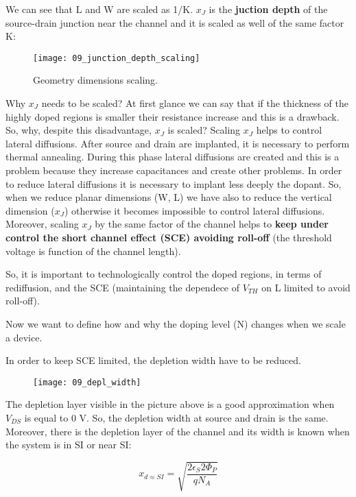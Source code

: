 \documentclass[a4paper, 12pt, twoside, openright]{report}
\begin{document}
{We can see that L and W are scaled as 1/K. $x_{J}$ is the \textbf{juction depth} of the source-drain junction near the channel and it is scaled as well of the same factor K:

	\begin{figure}[!h]
	\centering
	\texttt{[image: 09\_junction\_depth\_scaling]}
	\caption{Geometry dimensions scaling.}
	\label{}
	\end{figure}

Why $x_{J}$ needs to be scaled? At first glance we can say that if the thickness of the highly doped regions is smaller their resistance increase and this is a drawback. So, why, despite this disadvantage, $x_{J}$ is scaled? Scaling $x_{J}$ helps to control lateral diffusions. After source and drain are implanted, it is necessary to perform thermal annealing. During this phase lateral diffusions are created and this is a problem because they increase capacitances and create other problems. In order to reduce lateral diffusions it is necessary to implant less deeply the dopant. So, when we reduce planar dimensions (W, L) we have also to reduce the vertical dimension ($x_{J}$) otherwise it becomes impossible to control lateral diffusions. Moreover, scaling $x_{J}$ by the same factor of the channel helps to \textbf{keep under control the short channel effect (SCE) avoiding roll-off} (the threshold voltage is function of the channel length).

So, it is important to technologically control the doped regions, in terms of rediffusion, and the SCE (maintaining the dependece of $V_{TH}$ on L limited to avoid roll-off).

Now we want to define how and why the doping level (N) changes when we scale a device. 

In order to keep SCE limited, the depletion width have to be reduced.

\newpage

	\begin{figure}[H]
	\centering
	\texttt{[image: 09\_depl\_width]}
	\caption{}
	\label{}
	\end{figure}

The depletion layer visible in the picture above is a good approximation when $V_{DS}$ is equal to 0 V. So, the depletion width at source and drain is the same. Moreover, there is the depletion layer of the channel and its width is known when the system is in SI or near SI:

	\begin{equation}
	x_{d \approx SI} = \sqrt{\frac{2 \epsilon_S 2 \Phi_P}{q N_A}}
	\label{}
	\end{equation}

}
\end{document}
